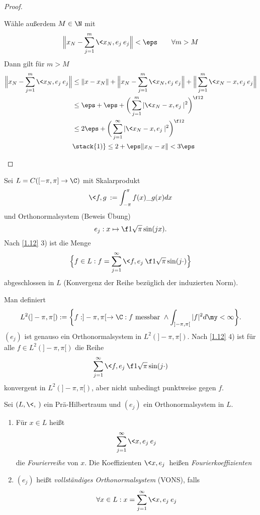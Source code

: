 \documentclass{mycourse}
\begin{document}
\begin{st}
\begin{proof}
\begin{enumerate}[1)]
				Wähle außerdem $M \in \N$ mit
				\[
					\Big\|x_N- \sum_{j=1}^m \<x_N,e_j\> e_j \Big\| < \eps
					\qquad \forall m > M
				\]
				Dann gilt für $m > M$
				\begin{align*}
					\Big\|x_N- \sum_{j=1}^m \<x_N,e_j\> e_j \Big\| 
					&\le \|x-x_N\| + \Big\|x_N - \sum_{j=1}^m \<x_N,e_j\> e_j \Big\| + \Big\| \sum_{j=1}^m \<x_N-x,e_j\> e_j \Big\|	\\
					&\le \eps + \eps + \bigg(\sum_{j=1}^m |\<x_N-x,e_j\>|^2 \bigg)^{\f 12} \\
					&\le 2\eps + \bigg(\sum_{j=1}^\infty |\<x_N-x,e_j\>|^2 \bigg)^{\f 12} \\
					&\stack{1)}\le 2 + \eps\|x_N-x\|
					< 3 \eps
				\end{align*}
		\end{enumerate}
	\end{proof}
\end{st}

\begin{ex} \label{1.13}
	Sei $L = C([-\pi,\pi] \to \C)$ mit Skalarprodukt
	\[
		\<f,g\> := \int_{-\pi}^{\pi}f(x)\_{g(x)} dx
	\]
	und Orthonormalsystem (Beweis Übung)
	\[
		e_j : x \mapsto \f 1{\sqrt{\pi}} \sin(jx).
	\]
	Nach \ref{1.12} 3) ist die Menge
	\[
		\Big\{ f \in L : f = \sum_{j=1}^\infty \<f,e_j\> \f 1{\sqrt{\pi}}\sin(j \cdot) \Big\}
	\]
	abgeschlossen in $L$ (Konvergenz der Reihe bezüglich der induzierten Norm).

	Man definiert
	\[
		L^2(]-\pi,\pi[) := \bigg\{ f: ]-\pi,\pi[ \to \C : f \text{ messbar } \land \int_{]-\pi,\pi[}|f|^2 d\my < \infty \bigg\}.
	\]
	$(e_j)$ ist genauso ein Orthonormalsystem in $L^2(]-\pi,\pi[)$.
	Nach \ref{1.12} 4) ist für alle $f \in L^2(]-\pi,\pi[)$ die Reihe
	\[
		\sum_{j=1}^\infty \<f,e_j\> \f 1{\sqrt{\pi}} \sin(j \cdot)
	\]
	konvergent in $L^2(]-\pi,\pi[)$, aber nicht unbedingt punktweise gegen $f$.
\end{ex}

\begin{df} \label{1.14}
	Sei $(L, \<,\>)$ ein Prä-Hilbertraum und $(e_j)$ ein Orthonormalsystem in $L$.
	\begin{enumerate}[1)]
		\item
			Für $x\in L$ heißt
			\[
				\sum_{j=1}^\infty \<x,e_j\> e_j
			\]
			die \emph{Fourierreihe} von $x$.
			Die Koeffizienten $\<x,e_j\>$ heißen \emph{Fourierkoeffizienten}
		\item
			$(e_j)$ heißt \emph{vollständiges Orthonormalsystem} (VONS), falls
			\[
				\forall x \in L  : x = \sum_{j=1}^\infty \<x,e_j\> e_j
			\]
	\end{enumerate}
\end{df}
\end{document}
